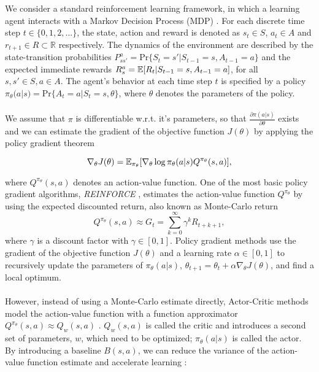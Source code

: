 We consider a standard reinforcement learning framework, in which a learning agent interacts with a Markov Decision Process (MDP) \citep{howard1960dynamic, sutton2018reinforcement}. For each discrete time step $t \in \{0,1,2,...\}$, the state, action and reward is denoted as $s_t \in \mathit{S}$, $a_t \in A$ and $r_{t+1} \in \mathit{R} \subset \mathbb{R}$ respectively. The dynamics of the environment are described by the state-transition probabilities $P^a_{ss'} = \text{Pr}\{S_t = s' | S_{t-1} = s, A_{t-1} = a\}$ and the expected immediate rewards $R^a_s = \operatorname{\mathbb{E}}[R_t | S_{t-1} = s, A_{t-1} = a]$, for all $s, s' \in S, a \in A$. The agent's behavior at each time step $t$ is specified by a policy $\pi_{\theta}(a|s) = \text{Pr}\{A_t = a | S_{t} = s, \theta\}$, where $\theta$ denotes the parameters of the policy. 
\\\\
We assume that $\pi$ is differentiable w.r.t. it's parameters, so that $\tfrac{\partial\pi(a|s)}{\partial \theta}$ exists and we can estimate the gradient of the objective function $J(\theta)$ by applying the policy gradient theorem \citep{sutton2000policy}

\begin{equation}
\label{equ:policygradienttheorem}
\nabla_{\theta}J(\theta)=\operatorname{\mathbb{E}}_{\pi_{\theta}}[\nabla_{\theta}\log\pi_{\theta}(a|s) Q^{\pi_{\theta}}(s, a)],
\end{equation}

where $Q^{\pi_{\theta}}(s, a)$ denotes an action-value function. One of the most basic policy gradient algorithms, \textit{REINFORCE} \citep{williams1992simple}, estimates the action-value function $Q^{\pi_{\theta}}$ by using the expected discounted return, also known as Monte-Carlo return
	\begin{equation}
	\label{equ:reinforce}
	Q^{\pi_\theta}(s, a) \approx \mathit{G}_t = \sum_{k=0}^{\infty}\gamma^k R_{t+k+1},
	\end{equation}
where $\gamma$ is a discount factor with $\gamma \in [0, 1]$. Policy gradient methods use the gradient of the objective function $J(\theta)$ and a learning rate $\alpha \in \left[0,1\right]$ to recursively update the parameters of $\pi_{\theta}(a|s)$, $\theta_{t+1} = \theta_t + \alpha \nabla_{\theta} J(\theta)$, and find a local optimum. 
\\\\
However, instead of using a Monte-Carlo estimate directly, Actor-Critic methods model the action-value function with a function approximator $Q^{\pi_\theta}(s, a) \approx Q_w(s,a)$ \citep{sutton2000policy}. $Q_w(s,a)$ is called the critic and introduces a second set of parameters, $w$, which need to be optimized; $\pi_{\theta}(a|s)$ is called the actor. By introducing a baseline $B(s,a)$, we can reduce the variance of the action-value function estimate and accelerate learning \citep{sutton2018reinforcement}:

